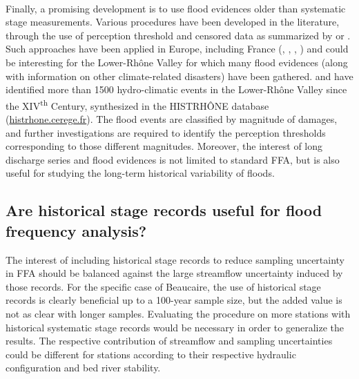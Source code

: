 \documentclass[11pt]{article}
\begin{document}
    \paragraph{}
    Finally, a promising development is to use flood evidences older than systematic stage measurements. Various procedures have been developed in the literature, through the use of perception threshold and censored data as summarized by \citet{kjeldsen_documentary_2014} or \citet{brazdil_historical_2006}. Such approaches have been applied in Europe, including France (\citet{naulet_flood_2005}, \citet{lang_extrapolation_2010}, \citet{neppel_flood_2010}, \citet{payrastre_usefulness_2011}) and could be interesting for the Lower-Rhône Valley for which many flood evidences (along with information on other climate-related disasters) have been gathered. \citet{pichard_sept_2014} and \citet{pichard_hydro-climatology_2017} have identified more than 1500 hydro-climatic events in the Lower-Rhône Valley since the XIV\textsuperscript{th} Century, synthesized in the HISTRHÔNE database (\url{histrhone.cerege.fr}). The flood events are classified by magnitude of damages, and further investigations are required to identify the perception thresholds corresponding to those different magnitudes. Moreover, the interest of long discharge series and flood evidences is not limited to standard FFA, but is also useful for studying the long-term historical variability of floods.
  
    \subsection{Are historical stage records useful for flood frequency analysis?}

    The interest of including historical stage records to reduce sampling uncertainty in FFA should be balanced against the large streamflow uncertainty induced by those records. For the specific case of Beaucaire, the use of historical stage records is clearly beneficial up to a 100-year sample size, but the added value is not as clear with longer samples. Evaluating the procedure on more stations with historical systematic stage records would be necessary in order to generalize the results. The respective contribution of streamflow and sampling uncertainties could be different for stations according to their respective hydraulic configuration and bed river stability.    
\end{document}
